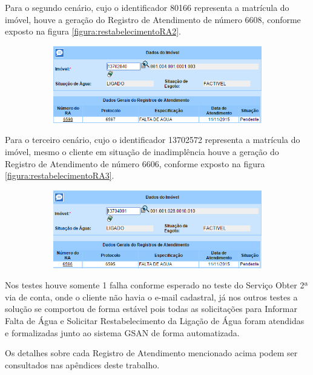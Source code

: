 Para o segundo cenário, cujo o identificador 80166 representa a matrícula do imóvel, houve a geração do Registro de Atendimento de número 6608, conforme exposto na figura \ref{figura:restabelecimentoRA2}.	

\begin{figure}[H]
	\centering
	\caption{\textbf{Restabelecimento da Ligação de Água - RA gerado para o Cenário 2}}
	\label{figura:restabelecimentoRA2}
	\begin{subfigure}[H]{\textwidth}
		\centering
		\includegraphics{figuras/cenarios/informar_falta_agua/resultado_2.PNG}
	\end{subfigure}
\end{figure}

	
Para o terceiro cenário, cujo o identificador 13702572 representa a matrícula do imóvel, mesmo o cliente em situação de inadimplência houve a geração do Registro de Atendimento de número 6606, conforme exposto na figura \ref{figura:restabelecimentoRA3}.	

\begin{figure}[H]
	\centering
	\caption{\textbf{Restabelecimento da Ligação de Água - RA gerado para o Cenário 3}}
	\label{figura:restabelecimentoRA3}
	\begin{subfigure}[H]{\textwidth}
		\centering
		\includegraphics{figuras/cenarios/informar_falta_agua/resultado_3.PNG}
	\end{subfigure}
\end{figure}


Nos testes houve somente 1 falha conforme esperado no teste do Serviço Obter 2ª via de conta, onde o cliente não havia o e-mail cadastral, já nos outros testes a solução se comportou de forma estável pois todas as solicitações para Informar Falta de Água e Solicitar Restabelecimento da Ligação de Água foram atendidas e formalizadas junto ao sistema GSAN de forma automatizada.

Os detalhes sobre cada Registro de Atendimento mencionado acima podem ser consultados nas apêndices deste trabalho.
